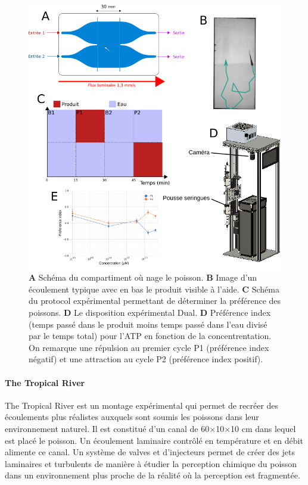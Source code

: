     \begin{figure}[h!]
      \centering
      \includegraphics[width=1\textwidth]{part_2/assets/resume1.png}
      \caption{\textbf{A} Schéma du compartiment où nage le poisson. \textbf{B} Image d'un écoulement typique avec en bas le produit visible à l'aide. \textbf{C} Schéma du protocol expérimental permettant de déterminer la préférence des poissons. \textbf{D} Le disposition expérimental Dual. \textbf{D} Préférence index (temps passé dans le produit moins temps passé dans l'eau divisé par le temps total) pour l'ATP en fonction de la concentrentation. On remarque une répulsion au premier cycle P1 (préférence index négatif) et une attraction au cycle P2 (préférence index positif).}
      \label{}
    \end{figure}

\paragraph{The Tropical River} The Tropical River est un montage expérimental qui permet de recréer des écoulements plus réalistes auxquels sont soumis les poissons dans leur environnement naturel. Il est constitué d'un canal de 60×10×10 cm dans lequel est placé le poisson. Un écoulement laminaire contrôlé en température et en débit alimente ce canal. Un système de valves et d'injecteurs permet de créer des jets laminaires et turbulents de manière à étudier la perception chimique du poisson dans un environnement plus proche de la réalité où la perception est fragmentée.

